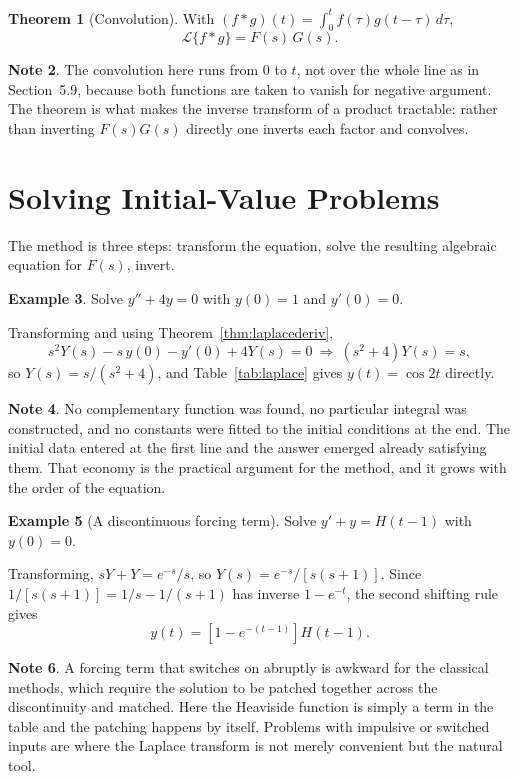 \documentclass[12pt,a4paper]{report}
\theoremstyle{definition}
\newtheorem{thm}{Theorem}[section]
\newtheorem{exa}[thm]{Example}
\newtheorem{note}[thm]{Note}
\theoremstyle{plain}
\begin{document}
\begin{thm}[Convolution]
\label{thm:laplaceconv}
With $(f*g)(t) = \displaystyle\int^{t}_{0}f(\tau)g(t-\tau)\,d\tau$,
$$\mathcal{L}\{f*g\} = F(s)\,G(s).$$
\end{thm}

\begin{note}
The convolution here runs from $0$ to $t$, not over the whole line as in
Section~5.9, because both functions are taken to vanish for negative argument.
The theorem is what makes the inverse transform of a product tractable: rather
than inverting $F(s)G(s)$ directly one inverts each factor and convolves.
\end{note}

\section{Solving Initial-Value Problems}

The method is three steps: transform the equation, solve the resulting algebraic
equation for $F(s)$, invert.

\begin{exa}
Solve $y'' + 4y = 0$ with $y(0)=1$ and $y'(0)=0$.

Transforming and using Theorem~\ref{thm:laplacederiv},
$$s^{2}Y(s) - s\,y(0) - y'(0) + 4Y(s) = 0
\ \Longrightarrow\ \left(s^{2}+4\right)Y(s) = s ,$$
so $Y(s) = s/\left(s^{2}+4\right)$, and Table~\ref{tab:laplace} gives
$y(t) = \cos 2t$ directly.
\end{exa}

\begin{note}
No complementary function was found, no particular integral was constructed,
and no constants were fitted to the initial conditions at the end. The initial
data entered at the first line and the answer emerged already satisfying them.
That economy is the practical argument for the method, and it grows with the
order of the equation.
\end{note}

\begin{exa}[A discontinuous forcing term]
Solve $y'+y = H(t-1)$ with $y(0)=0$.

Transforming, $sY+Y = e^{-s}/s$, so
$Y(s) = e^{-s}\big/\left[s(s+1)\right]$. Since
$1/\left[s(s+1)\right] = 1/s - 1/(s+1)$ has inverse $1-e^{-t}$, the second
shifting rule gives
$$y(t) = \left[1-e^{-(t-1)}\right]H(t-1).$$
\end{exa}

\begin{note}
A forcing term that switches on abruptly is awkward for the classical methods,
which require the solution to be patched together across the discontinuity and
matched. Here the Heaviside function is simply a term in the table and the
patching happens by itself. Problems with impulsive or switched inputs are where
the Laplace transform is not merely convenient but the natural tool.
\end{note}
\end{document}
